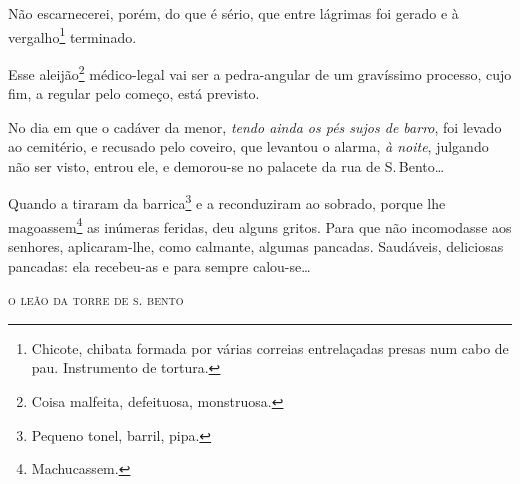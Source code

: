 {Não escarnecerei, porém, do que é sério, que entre lágrimas foi gerado e
à vergalho\footnote{Chicote, chibata formada por várias correias
  entrelaçadas presas num cabo de pau. Instrumento de tortura.}
terminado.

Esse aleijão\footnote{Coisa malfeita, defeituosa, monstruosa.}
médico-legal vai ser a pedra-angular de um gravíssimo processo, cujo
fim, a regular pelo começo, está previsto.

No dia em que o cadáver da menor, \emph{tendo ainda os pés sujos de
barro}, foi levado ao cemitério, e recusado pelo coveiro, que levantou o
alarma, \emph{à noite}, julgando não ser visto, entrou ele, e demorou-se
no palacete da rua de S.\,Bento\ldots{}

Quando a tiraram da barrica\footnote{Pequeno tonel, barril, pipa.} e a
reconduziram ao sobrado, porque lhe magoassem\footnote{Machucassem.}
as inúmeras feridas, deu
alguns gritos. Para que não incomodasse aos senhores, aplicaram-lhe,
como calmante, algumas pancadas. Saudáveis, deliciosas pancadas: ela
recebeu-as e para sempre calou-se\ldots{}

\medskip
\hfill\textsc{o leão da torre de s. bento}


}
